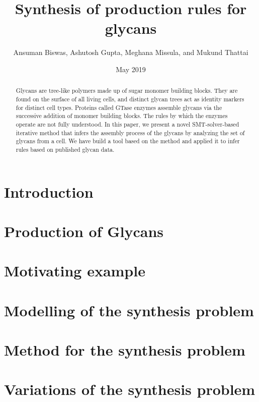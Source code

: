 \documentclass{llncs}
\title{%
  Synthesis of production rules for glycans}
\author{Ansuman Biswas, Ashutosh Gupta, Meghana Missula, and Mukund Thattai}
\date{May 2019}
\begin{document}
\maketitle

\begin{abstract}
  Glycans are tree-like polymers made up of sugar monomer building blocks. They are found on the surface of all living cells, and distinct glycan trees act as identity markers for distinct cell types. Proteins called GTase enzymes assemble glycans via the successive addition of monomer building blocks. The rules by which the enzymes operate are not fully understood. In this paper, we present a novel SMT-solver-based iterative method that infers the assembly process of the glycans by analyzing the set of glycans from a cell. We have build a tool based on the method and applied it to infer rules based on published glycan data.
\end{abstract}


\section{Introduction}
\label{sec:intro}


\section{Production of Glycans}
\label{sec:bio}



\section{Motivating example}
\label{sec:motivation}


\section{Modelling of the synthesis problem}
\label{sec:model}



\section{Method for the synthesis problem}
\label{sec:algo}


\section{Variations of the synthesis problem}
\label{sec:variations}

\end{document}
